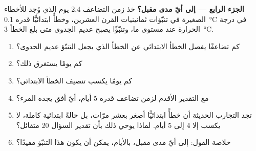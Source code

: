 \begin{problem}
\medskip\noindent\textbf{الجزء الرابع --- إلى أيّ مدى مقبل؟}
خذ زمن التضاعف 2.4 يوم الذي وُجد للأخطاء الصغيرة في تنبّؤات ثمانينيات القرن العشرين،
وخطأً ابتدائيًّا قدره \qty{0.1}{\celsius} في درجة الحرارة عند مستوى ما، وتنبّؤًا يصبح
عديم الجدوى متى بلغ الخطأ \qty{3}{\celsius}.
\begin{enumerate}[resume]
  \item كم تضاعفًا يفصل الخطأ الابتدائي عن الخطأ الذي يجعل التنبّؤ عديم الجدوى؟
  \item كم يومًا يستغرق ذلك؟
  \item كم يومًا يكسب تنصيف الخطأ الابتدائي؟
  \item مع التقدير الأقدم لزمن تضاعف قدره 5 أيام، أيّ أفق يجده المرء؟
  \item تجد التجارب الحديثة أن خطأً ابتدائيًّا أصغر بعشر مرّات، بل حالةً
        ابتدائية كاملة، لا يكسب إلا 4 إلى 5 أيام. لماذا يوحي ذلك بأن تقدير
        السؤال 20 متفائل؟
  \item خلاصة القول: إلى أيّ مدى مقبل، بالأيام، يمكن أن يكون هذا التنبّؤ مفيدًا؟
\end{enumerate}
\end{problem}
